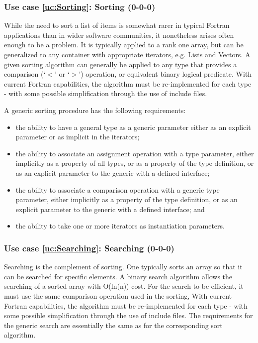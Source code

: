 \documentclass{article}
\newcounter{usecase}
\newcounter{requirement}
\newcommand{\newusecase}[2]{
\refstepcounter{usecase}\label{uc:#1}
\subsubsection{Use case \ref{uc:#1}: #1 (#2)}}
\begin{document}
\newusecase{Sorting}{0-0-0}

While the need to sort a list of items is somewhat rarer in typical
Fortran applications than in wider software communities, it
nonetheless arises often enough to be a problem.   It is typically
applied to a rank one array, but can be generalized to any container
with appropriate iterators, e.g. Lists and Vectors.  A given sorting
algorithm can generally be applied to any type that provides a
comparison (`$<$' or `$>$') operation, or equivalent binary logical
predicate.   With current Fortran
capabilities, the algorithm must be re-implemented for each type -
with some possible simplification through the use of include files.

A generic sorting procedure has the following requirements:
\begin{itemize}
\item the ability to have a general type as a generic parameter
  either as an explicit parameter or as implicit in the iterators;

\item the ability to associate an assignment operation with a type
  parameter, either implicitly as a property of all types, or
  as a property of the type definition, or as an explicit parameter to
  the generic with a defined interface;

\item the ability to associate a comparison operation with a generic
  type parameter, either implicitly
  as a property of the type definition, or as an explicit parameter to
  the generic with a defined interface; and

\item the ability to take one or more iterators as instantiation
  parameters.

\end{itemize}

\newusecase{Searching}{0-0-0}

Searching is the  complement of sorting. One typically sorts an array
so that it can be searched for specific elements. A binary search
algorithm allows the searching of a sorted array with O(ln(n)) cost.
For the search to be efficient, it must use the same comparison
operation used in the sorting,  With current Fortran
capabilities, the algorithm must be re-implemented for each type -
with some possible simplification through the use of include
files. The requirements for the generic search are essentially the
same as for the corresponding sort algorithm.
\end{document}
